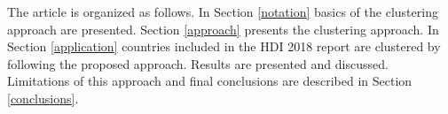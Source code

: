 \documentclass[]{elsarticle}
\theoremstyle{definition}
\begin{document}
The article is organized as follows. In Section \ref{notation} basics of the clustering approach are presented. Section \ref{approach} presents the clustering approach. In Section \ref{application}  countries included in the HDI 2018 report are clustered by following the proposed approach.  Results are presented and discussed.  Limitations of this approach and final conclusions are described in Section \ref{conclusions}.

%
%
%
%
%
%
%
\end{document}
